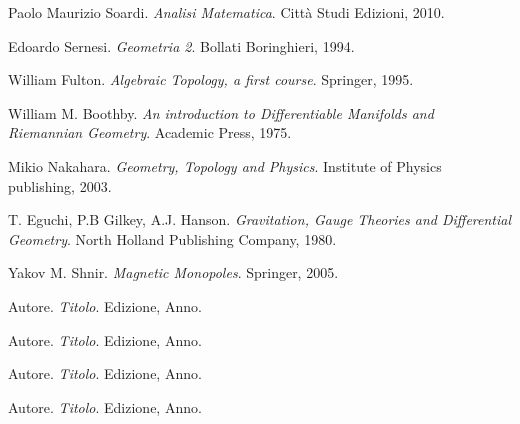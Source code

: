 \begin{thebibliography}{9}
   Paolo Maurizio Soardi.
   \textit{Analisi Matematica}.
   Città Studi Edizioni, 2010.

   Edoardo Sernesi.
   \textit{Geometria 2}.
   Bollati Boringhieri, 1994.

  William Fulton.
  \textit{Algebraic Topology, a first course}.
  Springer, 1995.

   William M. Boothby.
   \textit{An introduction to Differentiable Manifolds and Riemannian Geometry}.
   Academic Press, 1975.

   Mikio Nakahara.
   \textit{Geometry, Topology and Physics}.
   Institute of Physics publishing, 2003.

  T. Eguchi, P.B Gilkey, A.J. Hanson.
  \textit{Gravitation, Gauge Theories and Differential Geometry}.
  North Holland Publishing Company, 1980.

  Yakov M. Shnir.
  \textit{Magnetic Monopoles}.
  Springer, 2005.

   Autore.
   \textit{Titolo}.
   Edizione, Anno.

   Autore.
   \textit{Titolo}.
   Edizione, Anno.

  Autore.
  \textit{Titolo}.
  Edizione, Anno.

  Autore.
  \textit{Titolo}.
  Edizione, Anno.

\end{thebibliography}
